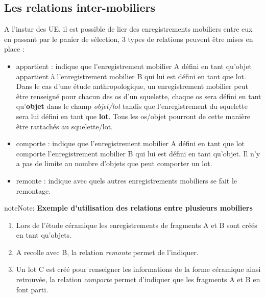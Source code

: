 \documentclass[letterpaper,10pt,french]{sphinxmanual}
\begin{document}
\subsection{Les relations inter-mobiliers}
\label{manuel/formulaire_mobilier:les-relations-inter-mobiliers}
A l'instar des UE, il est possible de lier des enregistrements mobiliers entre eux en passant par le panier de sélection, 3 types de relations peuvent être mises en place :
\begin{itemize}
\item {} 
appartient : indique que l'enregistrement mobilier A défini en tant qu'objet appartient à l'enregistrement mobilier B qui lui est défini en tant que lot. Dans le cas d'une étude anthropologique, un enregistrement mobilier peut être renseigné pour chacun des os d'un squelette, chaque os sera défini en tant qu'\textbf{objet} dans le champ \emph{objet/lot} tandis que l'enregistrement du squelette sera lui défini en tant que \textbf{lot}. Tous les os/objet pourront de cette manière être rattachés au squelette/lot.

\item {} 
comporte : indique que l'enregistrement mobilier A défini en tant que lot comporte l'enregistrement mobilier B qui lui est défini en tant qu'objet. Il n'y a pas de limite au nombre d'objets que peut comporter un lot.

\item {} 
remonte : indique avec quels autres enregistrements mobiliers se fait le remontage.

\end{itemize}

\begin{notice}{note}{Note:}
\textbf{Exemple d'utilisation des relations entre plusieurs mobiliers}
\begin{enumerate}
\item {} 
Lors de l'étude céramique les enregistrements de fragments A et B sont créés en tant qu'objets.

\item {} 
A recolle avec B, la relation \emph{remonte} permet de l'indiquer.

\item {} 
Un lot C est créé pour renseigner les informations de la forme céramique ainsi retrouvée, la relation \emph{comporte} permet d'indiquer que les fragments A et B en font parti.

\end{enumerate}
\end{notice}
\end{document}
